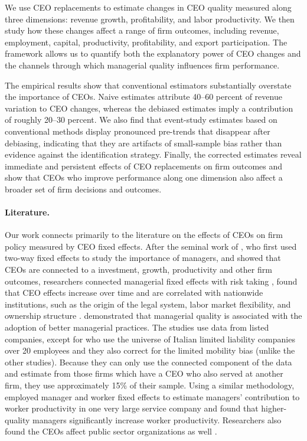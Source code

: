 \documentclass[11pt,a4paper]{article}
\begin{document}
We use CEO replacements to estimate changes in CEO quality measured along three dimensions: revenue growth, profitability, and labor productivity. We then study how these changes affect a range of firm outcomes, including revenue, employment, capital, productivity, profitability, and export participation. The framework allows us to quantify both the explanatory power of CEO changes and the channels through which managerial quality influences firm performance.

The empirical results show that conventional estimators substantially overstate the importance of CEOs. Naive estimates attribute 40–60 percent of revenue variation to CEO changes, whereas the debiased estimates imply a contribution of roughly 20–30 percent. We also find that event-study estimates based on conventional methods display pronounced pre-trends that disappear after debiasing, indicating that they are artifacts of small-sample bias rather than evidence against the identification strategy. Finally, the corrected estimates reveal immediate and persistent effects of CEO replacements on firm outcomes and show that CEOs who improve performance along one dimension also affect a broader set of firm decisions and outcomes.

\paragraph{Literature.} Our work connects primarily to the literature on the effects of CEOs on firm policy measured by CEO fixed effects. After the seminal work of \cite{Bertrand2003-io}, who first used two-way fixed effects to study the importance of managers, and showed that CEOs are connected to a investment, growth, productivity and other firm outcomes, researchers connected managerial fixed effects with risk taking \cite{schoar2024effect}, found that CEO effects increase over time \citep{quigley2015has} and are correlated with nationwide institutions, such as the origin of the legal system, labor market flexibility, and ownership structure \citep{crossland2011differences}. \cite{baltrunaite2023managerial} demonstrated that managerial quality is associated with the adoption of better managerial practices. The studies use data from listed companies, except for \cite{baltrunaite2023managerial} who use the universe of Italian limited liability companies over 20 employees and they also correct for the limited mobility bias (unlike the other studies). Because they can only use the connected component of the data and estimate from those firms which have a CEO who also served at another firm, they use approximately 15\% of their sample. Using a similar methodology, \cite{lazear2015value} employed manager and worker fixed effects to estimate managers' contribution to worker productivity in one very large service company and found that higher-quality managers significantly increase worker productivity. Researchers also found the CEOs affect public sector organizations as well \citep{fenizia2022managers, janke2024role}. 
\end{document}

